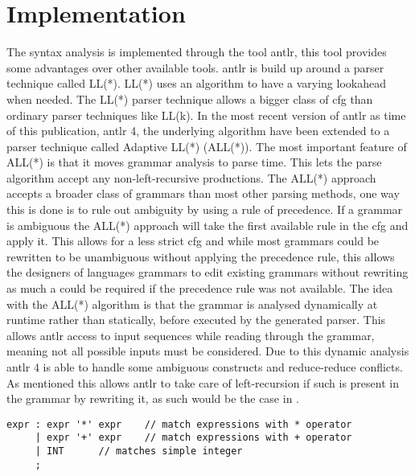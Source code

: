 \section{Implementation}
The syntax analysis is implemented through the tool \acrfull{antlr}, this tool provides some advantages over other available tools.
\acrshort{antlr} is build up around a parser technique called LL(*).
LL(*) uses an algorithm to have a varying lookahead when needed.
The LL(*) parser technique allows a bigger class of \acrshort{cfg} than ordinary parser techniques like LL(k).
In the most recent version of \acrshort{antlr} as time of this publication, \acrshort{antlr} 4, the underlying algorithm have been extended to a parser technique called Adaptive LL(*) (ALL(*)).
The most important feature of ALL(*) is that it moves grammar analysis to parse time.
This lets the parse algorithm accept any non-left-recursive productions.
The ALL(*) approach accepts a broader class of grammars than most other parsing methods, one way this is done is to rule out ambiguity by using a rule of precedence.
If a grammar is ambiguous the ALL(*) approach will take the first  available rule in the \acrshort{cfg} and apply it.
This allows for a less strict \acrshort{cfg} and while most grammars could be rewritten to be unambiguous without applying the precedence rule, this allows the designers of languages grammars to edit existing grammars without rewriting as much a could be required if the precedence rule was not available.	
The idea with the ALL(*) algorithm is that the grammar is analysed dynamically at runtime rather than statically, before executed by the generated parser.
This allows \acrshort{antlr} access to input sequences while reading through the grammar, meaning not all possible inputs must be considered.
Due to this dynamic analysis \acrshort{antlr} 4 is able to handle some ambiguous constructs and reduce-reduce conflicts.
As mentioned this allows \acrshort{antlr} to take care of left-recursion if such is present in the grammar by rewriting it, as such would be the case in .

\begin{lstlisting}[caption=An ambiguous rule for expr,frame=tlrb,label={lst:amb}]
expr : expr '*' expr 	// match expressions with * operator
     | expr '+' expr 	// match expressions with + operator
     | INT 		// matches simple integer
     ;
\end{lstlisting}

